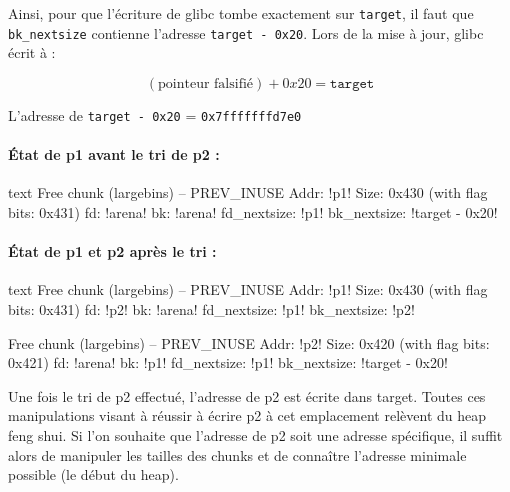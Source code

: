 Ainsi, pour que l’écriture de glibc tombe exactement sur \texttt{target}, il faut que \texttt{bk\_nextsize} contienne l’adresse \texttt{target - 0x20}.
Lors de la mise à jour, glibc écrit à :


\[
    (\text{pointeur falsifié}) + 0x20 = \texttt{target}
\]


L'adresse de \texttt{target - 0x20} = \textcolor{pwndbgbrown}{\texttt{0x7fffffffd7e0}}


\paragraph{État de p1 avant le tri de p2 :}
\begin{pwndbg}[heap]{text}
    Free chunk (largebins) -- PREV_INUSE
    Addr: !\textcolor{pwndbgred}{p1}!
    Size: 0x430 (with flag bits: 0x431)
    fd: !\textcolor{pwndbgpurple}{arena}!
    bk: !\textcolor{pwndbgpurple}{arena}!
    fd_nextsize: !\textcolor{pwndbgred}{p1}!
    bk_nextsize: !\textcolor{pwndbgbrown}{target - 0x20}!
\end{pwndbg}

\paragraph{État de p1 et p2 après le tri :}
\begin{pwndbg}[heap]{text}
    Free chunk (largebins) -- PREV_INUSE
    Addr: !\textcolor{pwndbgred}{p1}!
    Size: 0x430 (with flag bits: 0x431)
    fd: !\textcolor{pwndbgblue}{p2}!
    bk: !\textcolor{pwndbgpurple}{arena}!
    fd_nextsize: !\textcolor{pwndbgred}{p1}!
    bk_nextsize: !\textcolor{pwndbgblue}{p2}!


    Free chunk (largebins) -- PREV_INUSE
    Addr: !\textcolor{pwndbgblue}{p2}!
    Size: 0x420 (with flag bits: 0x421)
    fd: !\textcolor{pwndbgpurple}{arena}!
    bk: !\textcolor{pwndbgred}{p1}!
    fd_nextsize: !\textcolor{pwndbgred}{p1}!
    bk_nextsize: !\textcolor{pwndbgbrown}{target - 0x20}!
\end{pwndbg}


Une fois le tri de p2 effectué, l’adresse de p2 est écrite dans target.
Toutes ces manipulations visant à réussir à écrire p2 à cet emplacement
relèvent du heap feng shui.
Si l’on souhaite que l’adresse de p2 soit une adresse spécifique,
il suffit alors de manipuler les tailles des chunks et de connaître
l’adresse minimale possible (le début du heap).

